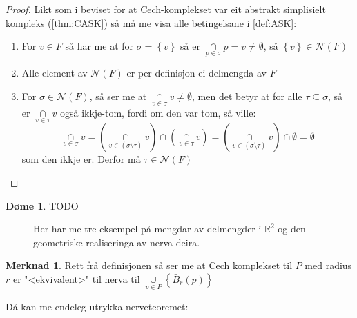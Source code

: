 \documentclass[a4paper, 12pt, norsk]{article}
\theoremstyle{plain}
\theoremstyle{definition}
\newtheorem{definition}[theorem]{Definisjon}
\newtheorem{example}[theorem]{Døme}
\newtheorem{remark}[theorem]{Merknad}
\newcommand{\Rb}{\mathbb{R}}
\newcommand{\Nc}{\mathcal{N}}
\newcommand{\intersect}{ \mathop{\cap}\limits } %
\newcommand{\union}{ \mathop{\cup}\limits }
\newcommand{\set}[1]{ \left \{ #1 \right \} } %
\begin{document}
\begin{proof}
	Likt som i beviset for at Cech-komplekset var eit abstrakt simplisielt kompleks (\autoref{thm:CASK}) så må me visa alle betingelsane i \autoref{def:ASK}:
	\begin{enumerate}
		\item{ 
			For \( v \in F \) så har me at for \( \sigma = \set{ v } \) så er \( \intersect_{ p \in \sigma } p = v \neq \emptyset \), så \( \set{v} \in \Nc(F) \) 
		}
		\item{ 
			Alle element av \( \Nc(F) \) er per definisjon ei delmengda av \( F \)
		}
		\item{  
			For \( \sigma \in \Nc(F) \), så ser me at \( \intersect_{v\in\sigma} v \neq \emptyset \), men det betyr at for alle \( \tau \subseteq \sigma \), så er \( \intersect_{v\in\tau} v \) også ikkje-tom, fordi om den var tom, så ville: 
			\[ 
				\intersect_{v\in\sigma} v = \left( \intersect_{v\in(\sigma\setminus\tau)} v \right) \intersect \left( \intersect_{v\in\tau} v \right) = \left( \intersect_{v\in(\sigma\setminus\tau)} v \right) \intersect \emptyset = \emptyset 
			\] 
			som den ikkje er. Derfor må \( \tau \in \Nc(F) \)
		}

	\end{enumerate}
\end{proof}

\begin{example}
	TODO
	\begin{figure}[htbp]
		\begin{center}
			
		\end{center}
		\caption{Her har me tre eksempel på mengdar av delmengder i \( \Rb^2 \) og den geometriske realiseringa av nerva deira.}
	\end{figure}
\end{example}

\begin{remark} \label{rem:cech-ekvivalent}
	Rett frå definisjonen så ser me at Cech komplekset til $P$ med radius $r$ er "<ekvivalent>" til nerva til $\union_{p \in P} \left \{ \bar{B}_r(p) \right \}$
\end{remark}

Då kan me endeleg utrykka nerveteoremet:

\end{document}
